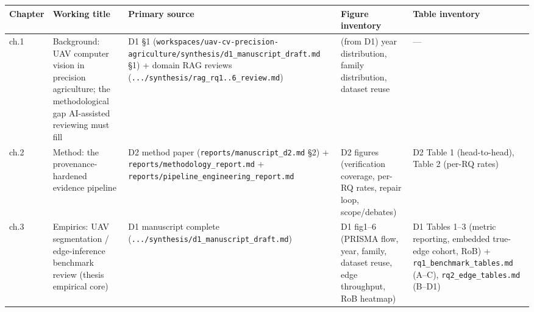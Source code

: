 \documentclass[11pt]{article}
\newcounter{none} %
\begin{document}
{\def\LTcaptype{none} %
\begin{longtable}[]{@{}
  >{\raggedright\arraybackslash}p{}
  >{\raggedright\arraybackslash}p{}
  >{\raggedright\arraybackslash}p{}
  >{\raggedright\arraybackslash}p{}
  >{\raggedright\arraybackslash}p{}@{}}
\toprule\noalign{}
\begin{minipage}[b]{\linewidth}\raggedright
Chapter
\end{minipage} & \begin{minipage}[b]{\linewidth}\raggedright
Working title
\end{minipage} & \begin{minipage}[b]{\linewidth}\raggedright
Primary source
\end{minipage} & \begin{minipage}[b]{\linewidth}\raggedright
Figure inventory
\end{minipage} & \begin{minipage}[b]{\linewidth}\raggedright
Table inventory
\end{minipage} \\
\midrule\noalign{}
\endhead
\bottomrule\noalign{}
\endlastfoot
ch.1 & Background: UAV computer vision in precision agriculture; the
methodological gap AI-assisted reviewing must fill & D1 §1
(\texttt{workspaces/uav-cv-precision-agriculture/synthesis/d1\_manuscript\_draft.md}
§1) + domain RAG reviews (\texttt{.../synthesis/rag\_rq1..6\_review.md})
& (from D1) year distribution, family distribution, dataset reuse &
--- \\
ch.2 & Method: the provenance-hardened evidence pipeline & D2 method
paper (\texttt{reports/manuscript\_d2.md} §2) +
\texttt{reports/methodology\_report.md} +
\texttt{reports/pipeline\_engineering\_report.md} & D2 figures
(verification coverage, per-RQ rates, repair loop, scope/debates) & D2
Table 1 (head-to-head), Table 2 (per-RQ rates) \\
ch.3 & Empirics: UAV segmentation / edge-inference benchmark review
(thesis empirical core) & D1 manuscript complete
(\texttt{.../synthesis/d1\_manuscript\_draft.md}) & D1 fig1--6 (PRISMA
flow, year, family, dataset reuse, edge throughput, RoB heatmap) & D1
Tables 1--3 (metric reporting, embedded true-edge cohort, RoB) +
\texttt{rq1\_benchmark\_tables.md} (A--C), \texttt{rq2\_edge\_tables.md}
(B--D1) \\

\end{longtable}}
\end{document}
